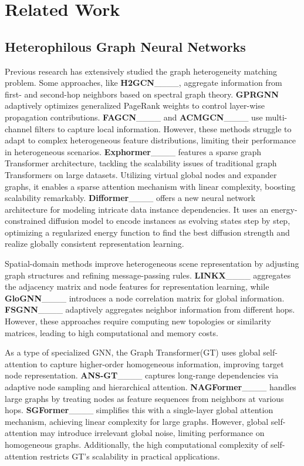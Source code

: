 \section{Related Work}
\subsection{Heterophilous Graph Neural Networks}  
Previous research has extensively studied the graph heterogeneity matching problem. Some approaches, like \textbf{H2GCN}____, aggregate information from first- and second-hop neighbors based on spectral graph theory. \textbf{GPRGNN} adaptively optimizes generalized PageRank weights to control layer-wise propagation contributions. \textbf{FAGCN}____ and \textbf{ACMGCN}____ use multi-channel filters to capture local information. However, these methods struggle to adapt to complex heterogeneous feature distributions, limiting their performance in heterogeneous scenarios. \textbf{Exphormer}____ features a sparse graph Transformer architecture, tackling the scalability issues of traditional graph Transformers on large datasets.  Utilizing virtual global nodes and expander graphs, it enables a sparse attention mechanism with linear complexity, boosting scalability remarkably.
\textbf{Difformer}____ offers a new neural network architecture for modeling intricate data instance dependencies.  It uses an energy-constrained diffusion model to encode instances as evolving states step by step, optimizing a regularized energy function to find the best diffusion strength and realize globally consistent representation learning.

Spatial-domain methods improve heterogeneous scene representation by adjusting graph structures and refining message-passing rules. \textbf{LINKX}____ aggregates the adjacency matrix and node features for representation learning, while \textbf{GloGNN}____ introduces a node correlation matrix for global information. \textbf{FSGNN}____ adaptively aggregates neighbor information from different hops. However, these approaches require computing new topologies or similarity matrices, leading to high computational and memory costs. 

As a type of specialized GNN, the Graph Transformer(GT) uses global self-attention to capture higher-order homogeneous information, improving target node representation. \textbf{ANS-GT}____ captures long-range dependencies via adaptive node sampling and hierarchical attention. \textbf{NAGFormer}____ handles large graphs by treating nodes as feature sequences from neighbors at various hops. \textbf{SGFormer}____ simplifies this with a single-layer global attention mechanism, achieving linear complexity for large graphs. However, global self-attention may introduce irrelevant global noise, limiting performance on homogeneous graphs. Additionally, the high computational complexity of self-attention restricts GT’s scalability in practical applications.


